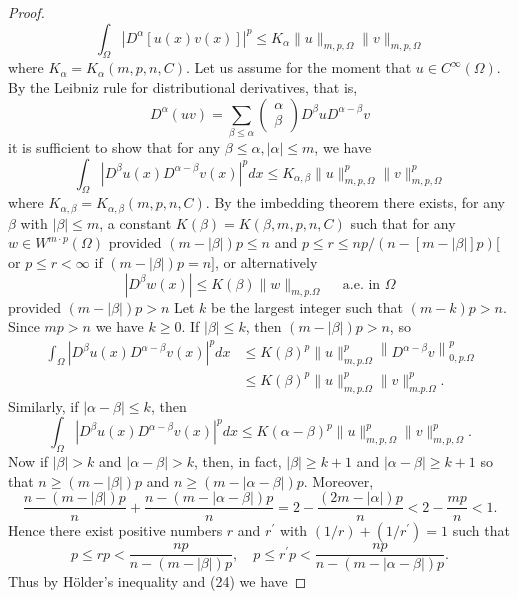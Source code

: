 \begin{proof}
  \[
  \int_{\Omega}\left|D^\alpha[u(x) v(x)]\right|^p \leq K_\alpha\|u\|_{m, p, \Omega}\|v\|_{m, p, \Omega}
  \]
  where $K_\alpha=K_\alpha(m, p, n, C)$. Let us assume for the moment that $u \in C^{\infty}(\Omega)$. By the Leibniz rule for distributional derivatives, that is,
  \[
  D^\alpha(u v)=\sum_{\beta \leq \alpha}\left(\begin{array}{l}
  \alpha \\
  \beta
  \end{array}\right) D^\beta u D^{\alpha-\beta} v
  \]
  it is sufficient to show that for any $\beta \leq \alpha,|\alpha| \leq m$, we have
  \[
  \int_{\Omega}\left|D^\beta u(x) D^{\alpha-\beta} v(x)\right|^p d x \leq K_{\alpha, \beta}\|u\|_{m, p, \Omega}^p\|v\|_{m, p, \Omega}^p
  \]
  where $K_{\alpha, \beta}=K_{\alpha, \beta}(m, p, n, C)$. By the imbedding theorem there exists, for any $\beta$ with $|\beta| \leq m$, a constant $K(\beta)=K(\beta, m, p, n, C)$ such that for any $w \in W^{m \cdot p}(\Omega)$
  provided $(m-|\beta|) p \leq n$ and $p \leq r \leq n p /(n-[m-|\beta|] p)[$ or $p \leq r<\infty$ if $(m-|\beta|) p=n]$, or alternatively
  \[
  \left|D^\beta w(x)\right| \leq K(\beta)\|w\|_{m, p . \Omega} \quad \text { a.e. in } \Omega
  \]
  provided $(m-|\beta|) p>n$
  Let $k$ be the largest integer such that $(m-k) p>n$. Since $m p>n$ we have $k \geq 0$. If $|\beta| \leq k$, then $(m-|\beta|) p>n$, so
  \[
  \begin{aligned}
  \int_{\Omega}\left|D^\beta u(x) D^{\alpha-\beta} v(x)\right|^p d x & \leq K(\beta)^p\|u\|_{m, p . \Omega}^p\left\|D^{\alpha-\beta} v\right\|_{0, p . \Omega}^p \\
  & \leq K(\beta)^p\|u\|_{m, p . \Omega}^p\|v\|_{m . p . \Omega}^p .
  \end{aligned}
  \]
  Similarly, if $|\alpha-\beta| \leq k$, then
  \[
  \int_{\Omega}\left|D^\beta u(x) D^{\alpha-\beta} v(x)\right|^p d x \leq K(\alpha-\beta)^p\|u\|_{m, p, \Omega}^p\|v\|_{m, p, \Omega}^p .
  \]
  Now if $|\beta|>k$ and $|\alpha-\beta|>k$, then, in fact, $|\beta| \geq k+1$ and $|\alpha-\beta| \geq k+1$ so that $n \geq(m-|\beta|) p$ and $n \geq(m-|\alpha-\beta|) p$. Moreover,
  \[
  \frac{n-(m-|\beta|) p}{n}+\frac{n-(m-|\alpha-\beta|) p}{n}=2-\frac{(2 m-|\alpha|) p}{n}<2-\frac{m p}{n}<1 .
  \]
  Hence there exist positive numbers $r$ and $r^{\prime}$ with $(1 / r)+\left(1 / r^{\prime}\right)=1$ such that
  \[
  p \leq r p<\frac{n p}{n-(m-|\beta|) p}, \quad p \leq r^{\prime} p<\frac{n p}{n-(m-|\alpha-\beta|) p} .
  \]
  Thus by Hölder's inequality and (24) we have

\end{proof}
